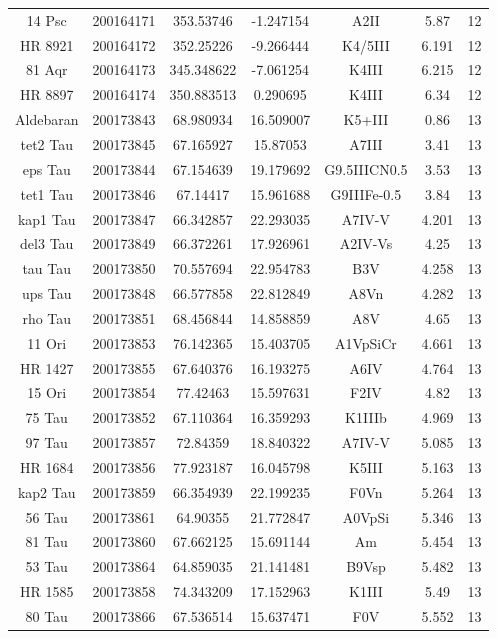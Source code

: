\begin{table*}
\begin{tabular}{ccccccc}
14 Psc & 200164171 & 353.53746 & -1.247154 & A2II & 5.87 & 12 \\
HR 8921 & 200164172 & 352.25226 & -9.266444 & K4/5III & 6.191 & 12 \\
81 Aqr & 200164173 & 345.348622 & -7.061254 & K4III & 6.215 & 12 \\
HR 8897 & 200164174 & 350.883513 & 0.290695 & K4III & 6.34 & 12 \\
Aldebaran & 200173843 & 68.980934 & 16.509007 & K5+III & 0.86 & 13 \\
tet2 Tau & 200173845 & 67.165927 & 15.87053 & A7III & 3.41 & 13 \\
eps Tau & 200173844 & 67.154639 & 19.179692 & G9.5IIICN0.5 & 3.53 & 13 \\
tet1 Tau & 200173846 & 67.14417 & 15.961688 & G9IIIFe-0.5 & 3.84 & 13 \\
kap1 Tau & 200173847 & 66.342857 & 22.293035 & A7IV-V & 4.201 & 13 \\
del3 Tau & 200173849 & 66.372261 & 17.926961 & A2IV-Vs & 4.25 & 13 \\
tau Tau & 200173850 & 70.557694 & 22.954783 & B3V & 4.258 & 13 \\
ups Tau & 200173848 & 66.577858 & 22.812849 & A8Vn & 4.282 & 13 \\
rho Tau & 200173851 & 68.456844 & 14.858859 & A8V & 4.65 & 13 \\
11 Ori & 200173853 & 76.142365 & 15.403705 & A1VpSiCr & 4.661 & 13 \\
HR 1427 & 200173855 & 67.640376 & 16.193275 & A6IV & 4.764 & 13 \\
15 Ori & 200173854 & 77.42463 & 15.597631 & F2IV & 4.82 & 13 \\
75 Tau & 200173852 & 67.110364 & 16.359293 & K1IIIb & 4.969 & 13 \\
97 Tau & 200173857 & 72.84359 & 18.840322 & A7IV-V & 5.085 & 13 \\
HR 1684 & 200173856 & 77.923187 & 16.045798 & K5III & 5.163 & 13 \\
kap2 Tau & 200173859 & 66.354939 & 22.199235 & F0Vn & 5.264 & 13 \\
56 Tau & 200173861 & 64.90355 & 21.772847 & A0VpSi & 5.346 & 13 \\
81 Tau & 200173860 & 67.662125 & 15.691144 & Am & 5.454 & 13 \\
53 Tau & 200173864 & 64.859035 & 21.141481 & B9Vsp & 5.482 & 13 \\
HR 1585 & 200173858 & 74.343209 & 17.152963 & K1III & 5.49 & 13 \\
80 Tau & 200173866 & 67.536514 & 15.637471 & F0V & 5.552 & 13 \\

\end{tabular}
\end{table*}
